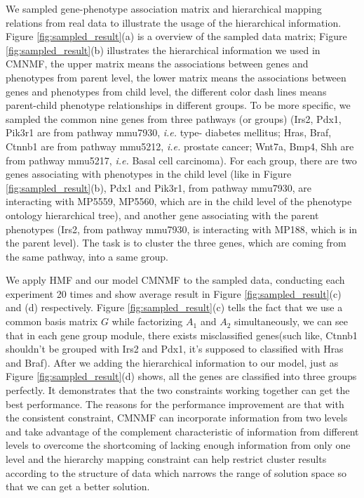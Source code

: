 \documentclass{bmcart}
\begin{document}
 We sampled gene-phenotype association matrix and hierarchical mapping relations from real data to illustrate the usage of the hierarchical information. Figure \ref{fig:sampled_result}(a) is a overview of the sampled data matrix; Figure \ref{fig:sampled_result}(b) illustrates the hierarchical information we used in CMNMF, the upper matrix means the associations between genes and phenotypes from parent level, the lower matrix means the associations between genes and phenotypes from child level, the different color dash lines means parent-child phenotype relationships in different groups.
To be more specific, we sampled the common nine genes from three pathways (or groups) (Irs2, Pdx1, Pik3r1 are from pathway mmu7930, \emph{i.e.} type-\uppercase\expandafter{} diabetes mellitus; Hras, Braf, Ctnnb1 are from pathway mmu5212, \emph{i.e.} prostate cancer; Wnt7a, Bmp4, Shh are from pathway mmu5217, \emph{i.e.} Basal cell carcinoma). For each group, there are two genes associating with phenotypes in the child level (like in Figure \ref{fig:sampled_result}(b), Pdx1 and Pik3r1, from pathway mmu7930, are interacting with MP5559, MP5560, which are in the child level of the phenotype ontology hierarchical tree), and another gene associating with the parent phenotypes (Irs2, from pathway mmu7930, is interacting with MP188, which is in the parent level). The task is to cluster the three genes, which are coming from the same pathway, into a same group.

  We apply HMF and our model CMNMF to the sampled data, conducting each experiment 20 times and show average result in Figure \ref{fig:sampled_result}(c) and (d) respectively. Figure \ref{fig:sampled_result}(c) tells the fact that we use a common basis matrix $G$ while factorizing $A_1$ and $A_2$ simultaneously, we can see that in each gene group module, there exists misclassified genes(such like, Ctnnb1 shouldn't be grouped with Irs2 and Pdx1, it's supposed to classified with Hras and Braf). After we adding the hierarchical information to our model, just as Figure \ref{fig:sampled_result}(d) shows, all the genes are classified into three groups perfectly. It demonstrates that the two constraints working together can get the best performance. The reasons for the performance improvement are that with the consistent constraint, CMNMF can incorporate information from two levels and take advantage of the complement characteristic of information from different levels to overcome the shortcoming of lacking enough information from only one level and the hierarchy mapping constraint can help restrict cluster results according to the structure of data which narrows the range of solution space so that we can get a better solution.
\end{document}
